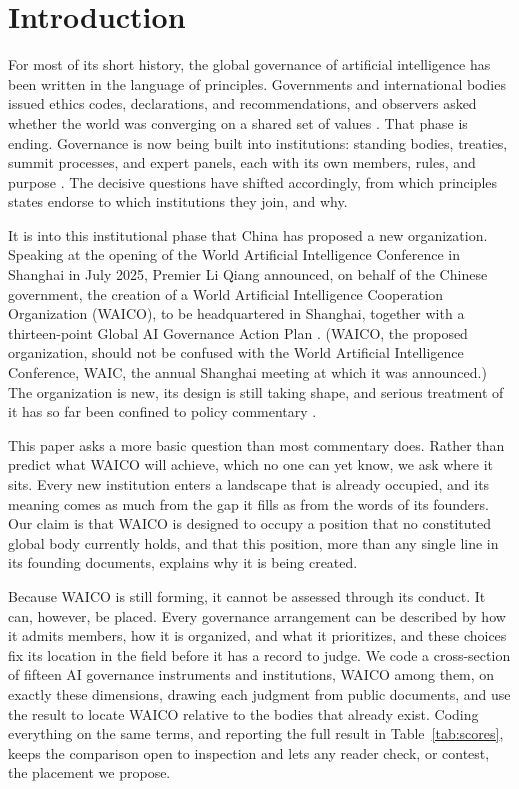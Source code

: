 \documentclass[11pt]{article}
\begin{document}
\section{Introduction}
For most of its short history, the global governance of artificial intelligence has been written in the language of principles. Governments and international bodies issued ethics codes, declarations, and recommendations, and observers asked whether the world was converging on a shared set of values \citep{jobin2019global}. That phase is ending. Governance is now being built into institutions: standing bodies, treaties, summit processes, and expert panels, each with its own members, rules, and purpose \citep{schmitt2021mapping, geith2025emerging}. The decisive questions have shifted accordingly, from which principles states endorse to which institutions they join, and why.

It is into this institutional phase that China has proposed a new organization. Speaking at the opening of the World Artificial Intelligence Conference in Shanghai in July 2025, Premier Li Qiang announced, on behalf of the Chinese government, the creation of a World Artificial Intelligence Cooperation Organization (WAICO), to be headquartered in Shanghai, together with a thirteen-point Global AI Governance Action Plan \citep{govcn2025waic, mfa2025actionplan}. (WAICO, the proposed organization, should not be confused with the World Artificial Intelligence Conference, WAIC, the annual Shanghai meeting at which it was announced.) The organization is new, its design is still taking shape, and serious treatment of it has so far been confined to policy commentary \citep{basu2026pivot, nature2025china, cnn2025waic}.

This paper asks a more basic question than most commentary does. Rather than predict what WAICO will achieve, which no one can yet know, we ask where it sits. Every new institution enters a landscape that is already occupied, and its meaning comes as much from the gap it fills as from the words of its founders. Our claim is that WAICO is designed to occupy a position that no constituted global body currently holds, and that this position, more than any single line in its founding documents, explains why it is being created.

Because WAICO is still forming, it cannot be assessed through its conduct. It can, however, be placed. Every governance arrangement can be described by how it admits members, how it is organized, and what it prioritizes, and these choices fix its location in the field before it has a record to judge. We code a cross-section of fifteen AI governance instruments and institutions, WAICO among them, on exactly these dimensions, drawing each judgment from public documents, and use the result to locate WAICO relative to the bodies that already exist. Coding everything on the same terms, and reporting the full result in Table~\ref{tab:scores}, keeps the comparison open to inspection and lets any reader check, or contest, the placement we propose.
\end{document}
